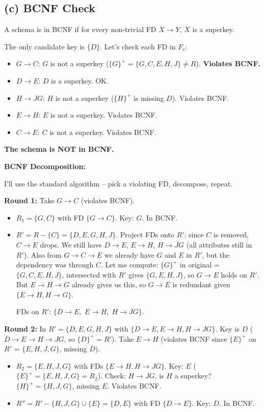 \documentclass[11pt]{article}
\begin{document}
\subsection{(c) BCNF Check}

A schema is in BCNF if for every non-trivial FD $X \to Y$, $X$ is a superkey.

The only candidate key is $\{D\}$. Let's check each FD in $F_c$:

\begin{itemize}
  \item $G \to C$: $G$ is not a superkey ($\{G\}^+ = \{G,C,E,H,J\} \neq R$). \textbf{Violates BCNF.}
  \item $D \to E$: $D$ is a superkey. OK.
  \item $H \to JG$: $H$ is not a superkey ($\{H\}^+$ is missing $D$). Violates BCNF.
  \item $E \to H$: $E$ is not a superkey. Violates BCNF.
  \item $C \to E$: $C$ is not a superkey. Violates BCNF.
\end{itemize}

\textbf{The schema is NOT in BCNF.}

\medskip
\noindent\textbf{BCNF Decomposition:}

I'll use the standard algorithm -- pick a violating FD, decompose, repeat.

\medskip
\noindent\textbf{Round 1:} Take $G \to C$ (violates BCNF).
\begin{itemize}
  \item $R_1 = \{G, C\}$ with FD $\{G \to C\}$. Key: $G$. In BCNF.
  \item $R' = R - \{C\} = \{D, E, G, H, J\}$. Project FDs onto $R'$: since $C$ is removed, $C \to E$ drops. We still have $D \to E$, $E \to H$, $H \to JG$ (all attributes still in $R'$). Also from $G \to C \to E$ we already have $G$ and $E$ in $R'$, but the dependency was through $C$. Let me compute: $\{G\}^+$ in original = $\{G,C,E,H,J\}$, intersected with $R'$ gives $\{G,E,H,J\}$, so $G \to E$ holds on $R'$. But $E \to H \to G$ already gives us this, so $G \to E$ is redundant given $\{E \to H, H \to G\}$.

  FDs on $R'$: $\{D \to E,\; E \to H,\; H \to JG\}$.
\end{itemize}

\noindent\textbf{Round 2:} In $R' = \{D, E, G, H, J\}$ with $\{D \to E, E \to H, H \to JG\}$. Key is $D$ ($D \to E \to H \to JG$, so $\{D\}^+ = R'$). Take $E \to H$ (violates BCNF since $\{E\}^+$ on $R'$ = $\{E,H,J,G\}$, missing $D$).
\begin{itemize}
  \item $R_2 = \{E, H, J, G\}$ with FDs $\{E \to H, H \to JG\}$. Key: $E$ ($\{E\}^+ = \{E,H,J,G\} = R_2$). Check: $H \to JG$, is $H$ a superkey? $\{H\}^+ = \{H,J,G\}$, missing $E$. Violates BCNF.
  \item $R'' = R' - \{H, J, G\} \cup \{E\} = \{D, E\}$ with FD $\{D \to E\}$. Key: $D$. In BCNF.
\end{itemize}
\end{document}
